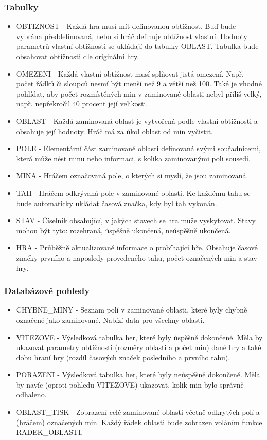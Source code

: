 \documentclass[12pt, a4paper]{article}
\begin{document}
\subsubsection{Tabulky}
\begin{itemize}
\item OBTIZNOST - Každá hra musí mít definovanou obtížnost. Buď bude vybrána předdefinovaná, nebo si hráč definuje obtížnost vlastní. Hodnoty parametrů vlastní obtížnosti se ukládají do tabulky OBLAST. Tabulka bude obsahovat obtížnosti dle originální hry.
\item OMEZENI - Každá vlastní obtížnost musí splňovat jistá omezení. Např. počet řádků či sloupců nesmí být menší než 9 a větší než 100. Také je vhodné pohlídat, aby počet rozmístěných min v zaminované oblasti nebyl příliš velký, např. nepřekročil 40 procent její velikosti.
\item OBLAST - Každá zaminovaná oblast je vytvořená podle vlastní obtížnosti a obsahuje její hodnoty. Hráč má za úkol oblast od min vyčistit.
\item POLE - Elementární část zaminované oblasti definovaná svými souřadnicemi, která může nést minu nebo informaci, s kolika zaminovanými poli sousedí.
\item MINA - Hráčem označovaná pole, o kterých si myslí, že jsou zaminovaná.
\item TAH - Hráčem odkrývaná pole v zaminované oblasti. Ke každému tahu se bude automaticky ukládat časová značka, kdy byl tah vykonán.
\item STAV - Číselník obsahující, v jakých stavech se hra může vyskytovat. Stavy mohou být tyto: rozehraná, úspěšně ukončená, neúspěšně ukončená.
\item HRA - Průběžně aktualizované informace o probíhající hře. Obsahuje časové značky prvního a naposledy provedeného tahu, počet označených min a stav hry.
\end{itemize}

\subsubsection{Databázové pohledy}

\begin{itemize}
\item CHYBNE\_MINY - Seznam polí v zaminované oblasti, které byly chybně označené jako zaminované. Nabízí data pro všechny oblasti.
\item VITEZOVE - Výsledková tabulka her, které byly úspěšně dokončené. Měla by ukazovat parametry obtížnosti (rozměry oblasti a počet min) dané hry a také dobu hraní hry (rozdíl časových značek posledního a prvního tahu).
\item PORAZENI - Výsledková tabulka her, které byly neúspěšně dokončené. Měla by navíc (oproti pohledu VITEZOVE) ukazovat, kolik min bylo správně odhaleno.
\item OBLAST\_TISK - Zobrazení celé zaminované oblasti včetně odkrytých polí a (hráčem) označených min. Každý řádek oblasti bude zobrazen voláním funkce RADEK\_OBLASTI.
\end{itemize}
\end{document}
